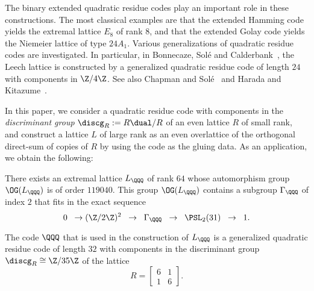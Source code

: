 \documentclass{amsart}
\begin{document}
The binary extended quadratic residue codes
play an important role in these constructions.
The most classical examples are that
the extended Hamming code yields
the extremal lattice $E_8$ of rank $8$,
and that the extended Golay code  yields
the Niemeier lattice of type $24 A_1$.
Various generalizations of quadratic residue codes
are investigated.
In particular, in Bonnecaze, Sol\'e and Calderbank~\cite{BPC},
the Leech lattice is constructed by 
a generalized quadratic residue code of length $24$ with components in  $\Z/4\Z$.
See also Chapman and Sol\'e~\cite{CS1996} and Harada and Kitazume~\cite{HK2000}.
\par
In this paper,
we consider a quadratic residue code
with components  in the \emph{discriminant group} $\discg_R:=R\dual/R$
of an even lattice $R$ of small rank,
and construct a lattice $L$ of large rank
as an  even overlattice of the orthogonal direct-sum of copies of $R$
by using the  code as  the gluing data.
As an application, we obtain the following:
%
\begin{theorem}\label{thm:main}
There exists an extremal lattice $L_{\QQQ}$ of rank $64$
whose automorphism group $\OG(L_{\QQQ})$ is of order $119040$.
This group $\OG(L_{\QQQ})$  contains 
a subgroup $\Gamma_{\QQQ}$  of index $2$ that fits in the exact sequence
%
\begin{equation}\label{eq:Gammaexact}
0 \;\; \to (\Z/2\Z)^2\;\;  \to\;\; \Gamma_{\QQQ}\;\; \to \;\; \PSL_2(31)\;\; \to \;\; 1.
\end{equation}
%
\end{theorem}
%
The code $\QQQ$ that is  used in the construction of $L_{\QQQ}$  is
a generalized quadratic residue code  of length $32$
 with components in the discriminant group  $\discg_R\cong \Z/35\Z$
 of the lattice
$$
R=\left[\begin{array}{cc}  6 & 1 \\ 1 & 6 \end{array}\right].
$$
\end{document}

